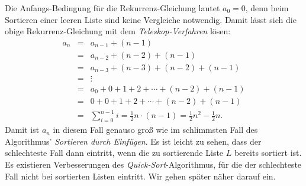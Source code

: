 Die Anfangs-Bedingung f\"ur die Rekurrenz-Gleichung lautet $a_0 = 0$, denn beim Sortieren einer leeren Liste sind keine
Vergleiche notwendig.  Damit l\"asst sich die obige Rekurrenz-Gleichung mit dem \emph{Teleskop-Verfahren} l\"osen:
\[
\begin{array}{lcl}
  a_n & = & a_{n-1} + (n-1) \\
      & = & a_{n-2} + (n-2) + (n-1) \\
      & = & a_{n-3} + (n-3) + (n-2) + (n-1) \\
      & = & \vdots \\
      & = & a_{0} + 0 + 1 + 2 + \cdots  + (n-2) + (n-1) \\
      & = & 0 + 0 + 1 + 2 + \cdots  + (n-2) + (n-1) \\[0.1cm]
      & = & \sum\limits_{i=0}^{n-1} i  =  \frac{1}{2} n \cdot(n - 1) =\frac{1}{2} n^2 - \frac{1}{2} n.
\end{array}
\]
Damit ist $a_n$ in diesem Fall genauso gro{\ss} wie im schlimmsten Fall des Algorithmus' \emph{Sortieren durch Einf\"ugen}.
Es ist leicht zu sehen, dass der schlechteste Fall dann eintritt, wenn die zu sortierende Liste $L$
bereits sortiert ist.  Es existieren Verbesserungen des \emph{Quick-Sort}-Algorithmus, f\"ur
die der schlechteste Fall nicht bei sortierten Listen eintritt.  Wir gehen sp\"ater n\"aher darauf ein.

